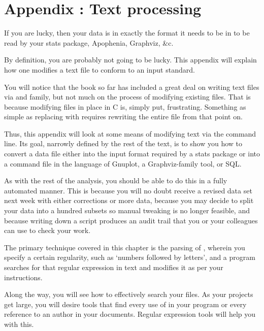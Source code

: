 \renewcommand\thechapter{\Alph{chapter}}
\setcounter{chapter}{1}
\setcounter{section}{0}
\setcounter{subsection}{0}
\setcounter{ex}{0}
\chapter{Appendix \thechapter: Text processing} \label{textappendix}

If you are lucky, then your data is in exactly the format it needs to be
in to be read by your stats package, Apophenia, Graphviz, \&c.

By definition, you are probably not going to be lucky. This appendix will
explain how one modifies a text file to conform to an input standard. 

You will notice that the book so far has included a great deal on writing
text files via  and family, but not much on the process of
modifying existing files. That is because modifying files in place in
C is, simply put, frustrating. Something as simple as replacing 
with  requires rewriting the entire file from that point on.

Thus, this appendix will look at some means of modifying text via the
command line. Its goal, narrowly defined by the rest of the text, is to
show you how to convert a data file either into the input format required
by a stats package or into a command file in the language of Gnuplot,
a Graphviz-family tool, or SQL.

As with the rest of the analysis, you should be able to do this in a
fully automated manner. This is because you will no doubt receive a
revised data set next week with either corrections or more data, because
you may decide to split your data into a hundred subsets so manual
tweaking is no longer feasible, and because writing down a script
produces an audit trail that you or your colleagues can use to check
your work.

The primary technique covered in this chapter is the parsing of
, wherein you specify a certain regularity,
such as `numbers followed by letters', and a program searches for that
regular expression in text and modifies it as per your instructions.

Along the way, you will see how to effectively search your files. As
your projects get large, you will desire tools that find every use of
 in your program or every reference to an author in
your documents. Regular expression tools will help you with this.

